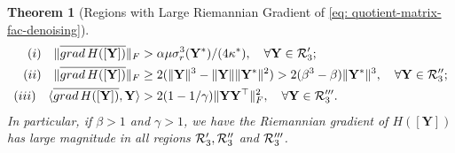 \documentclass[11pt]{article}
\newtheorem{Theorem}{Theorem}
\newcommand{\0}{{\mathbf{0}}}
\newcommand{\1}{{\mathbf{1}}}
\newcommand{\Y}{{\mathbf{Y}}}
\newcommand{\cR}{{\cal R}}
\newcommand{\grad}{{\rm grad}}
\newcommand{\F}{{\rm F}}
\begin{document}
\begin{Theorem}[Regions with Large Riemannian Gradient of \eqref{eq: quotient-matrix-fac-denoising}] \label{th: H-large-gradient-norm}
\begin{equation*}
	\begin{split}
	(i) \quad	\|\overline{\grad\, H([\Y])} \|_\F &> \alpha \mu \sigma^3_r(\Y^*)/(4\kappa^*), \quad \forall \Y \in \cR_3'; \\
	(ii) \quad	\|\overline{\grad\, H([\Y])} \|_\F &\geq 2(\|\Y\|^3 - \|\Y\| \|\Y^*\|^2) > 2(\beta^3 - \beta) \|\Y^*\|^3, \quad \forall \Y \in \cR_3''; \\
	(iii) \quad	\langle \overline{\grad\, H([\Y])} , \Y \rangle & > 2 (1 - 1/\gamma )  \|\Y\Y^\top\|^2_\F, \quad \forall \Y \in \cR_3'''.
	\end{split}
\end{equation*}
	In particular, if $\beta > 1$ and $\gamma > 1$, we have the Riemannian gradient of $H([\Y])$ has large magnitude in all regions $\cR_3', \cR_3''$ and $\cR_3'''$.
\end{Theorem}
\end{document}
